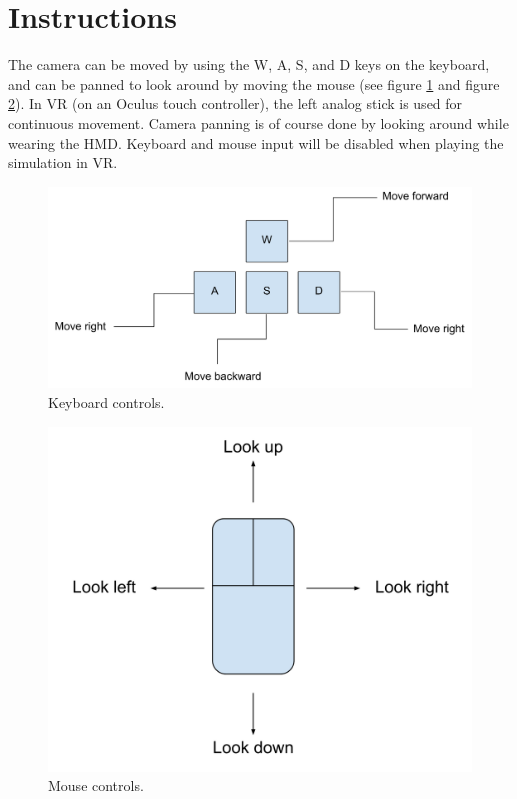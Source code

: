 \documentclass{article}
\begin{document}
    \section{Instructions}
    The camera can be moved by using the W, A, S, and D keys on the keyboard, and can be panned to look around by moving the mouse (see figure \ref{keyboard} and figure \ref{mouse}). In VR (on an Oculus touch controller), the left analog stick is used for continuous movement. Camera panning is of course done by looking around while wearing the HMD. Keyboard and mouse input will be disabled when playing the simulation in VR.
    \begin{figure}[h]
        \centering
        \includegraphics[scale=0.2]{keyboard_controls.png}
        \caption{Keyboard controls.}
        \label{keyboard}
    \end{figure}
    \begin{figure}[h]
        \centering
        \includegraphics[scale=0.25]{mouse_controls.png}
        \caption{Mouse controls.}
        \label{mouse}
    \end{figure}
\end{document}

